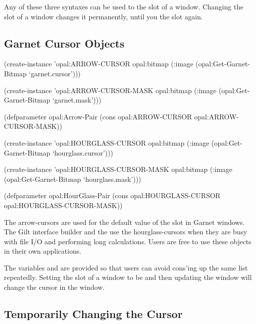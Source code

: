 
Any of these three syntaxes can be used to  the 
slot of a window.  Changing the  slot of a window changes
it permanently, until you  the  slot again.


\begin{group}
\subsection{Garnet Cursor Objects}
 

\begin{programexample}
(create-instance 'opal:ARROW-CURSOR opal:bitmap
  (:image (opal:Get-Garnet-Bitmap `garnet.cursor')))

(create-instance 'opal:ARROW-CURSOR-MASK opal:bitmap
  (:image (opal:Get-Garnet-Bitmap `garnet.mask')))

(defparameter opal:Arrow-Pair
              (cons opal:ARROW-CURSOR opal:ARROW-CURSOR-MASK))



(create-instance 'opal:HOURGLASS-CURSOR opal:bitmap
  (:image (opal:Get-Garnet-Bitmap `hourglass.cursor')))

(create-instance 'opal:HOURGLASS-CURSOR-MASK opal:bitmap
  (:image (opal:Get-Garnet-Bitmap `hourglass.mask')))

(defparameter opal:HourGlass-Pair
              (cons opal:HOURGLASS-CURSOR opal:HOURGLASS-CURSOR-MASK))
\end{programexample}
\end{group}
\vspace{1 line}

The arrow-cursors are used for the default value of the  slot
in Garnet windows.  The Gilt interface builder and the  use
the hourglass-cursors when they are busy with file I/O and performing long
calculations.  Users are free to use these objects in their own applications.

The variables  and  are provided
so that users can avoid
cons'ing up the same list repeatedly.  Setting the  slot of
a window to be  and then updating the window
will change the cursor in the window.



\subsection{Temporarily Changing the Cursor}
\label{with-hourglass-sec}

